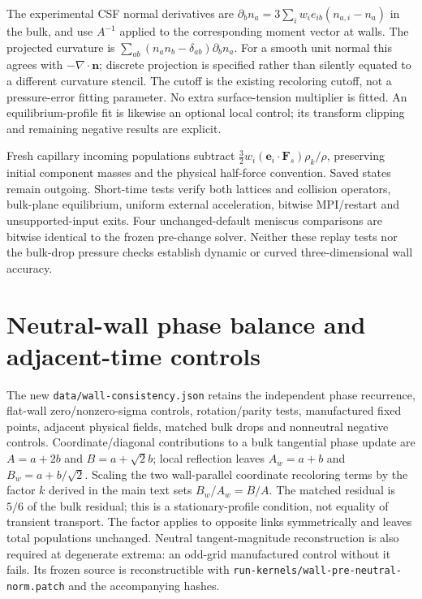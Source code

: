 \documentclass[11pt]{article}
\begin{document}


The experimental CSF normal derivatives are
$\partial_b n_a=3\sum_i w_i e_{ib}(n_{a,i}-n_a)$ in the bulk, and use
$A^{-1}$ applied to the corresponding moment vector at walls.
The projected curvature is $\sum_{ab}(n_an_b-\delta_{ab})\partial_b n_a$.
For a smooth unit normal this agrees with $-\nabla\cdot\bm n$; discrete
projection is specified rather than silently equated to a different
curvature stencil. The cutoff is the existing recoloring cutoff, not a
pressure-error fitting parameter. No extra surface-tension multiplier is
fitted. An equilibrium-profile fit is likewise an optional local control;
its transform clipping and remaining negative results are explicit.

Fresh capillary incoming populations subtract
$\tfrac32 w_i(\bm e_i\cdot\bm F_s)\rho_k/\rho$, preserving initial
component masses and the physical half-force convention. Saved states
remain outgoing. Short-time tests verify both lattices and collision
operators, bulk-plane equilibrium, uniform external acceleration,
bitwise MPI/restart and unsupported-input exits. Four unchanged-default
meniscus comparisons are bitwise identical to the frozen pre-change solver.
Neither these replay tests nor the bulk-drop pressure checks establish
dynamic or curved three-dimensional wall accuracy.

\section{Neutral-wall phase balance and adjacent-time controls}
The new \texttt{data/wall-consistency.json} retains the independent phase
recurrence, flat-wall zero/nonzero-sigma controls, rotation/parity tests,
manufactured fixed points, adjacent physical fields, matched bulk drops
and nonneutral negative controls. Coordinate/diagonal contributions to a
bulk tangential phase update are $A=a+2b$ and $B=a+\sqrt{2}b$; local reflection
leaves $A_w=a+b$ and $B_w=a+b/\sqrt{2}$. Scaling the two wall-parallel
coordinate recoloring terms by the factor $k$ derived in the main text
sets $B_w/A_w=B/A$. The matched residual is $5/6$ of the bulk residual;
this is a stationary-profile condition, not equality of transient transport.
The factor applies to opposite links symmetrically and leaves total
populations unchanged. Neutral tangent-magnitude reconstruction is also
required at degenerate extrema: an odd-grid manufactured control without
it fails. Its frozen source is reconstructible with
\texttt{run-kernels/wall-pre-neutral-norm.patch} and the accompanying hashes.
\end{document}
